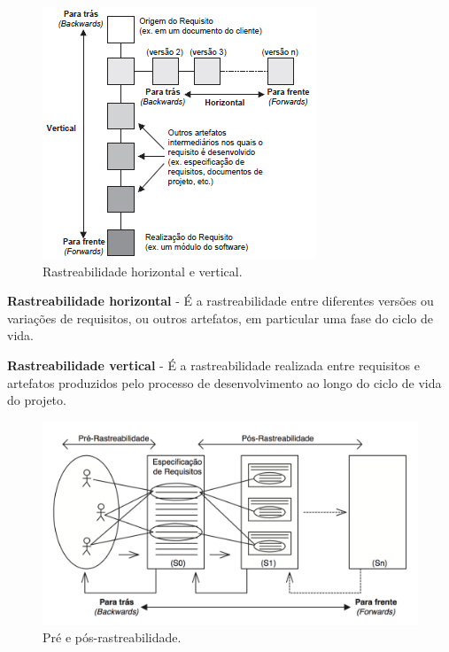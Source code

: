   \begin{figure}[!htbp]
    \centering
    \includegraphics[scale=0.75]{editaveis/figuras/tipos_de_rastreabilidade}
    \caption[Rastreabilidade horizontal e vertical.]{Rastreabilidade horizontal e vertical. \footnotemark}
    \label{ramos_rastreabilidade}
  \end{figure}

\textbf{Rastreabilidade horizontal} - É a rastreabilidade entre diferentes versões ou variações de requisitos, ou outros artefatos, em particular uma fase do ciclo de vida\cite{tese_doutorado}.

\textbf{Rastreabilidade vertical} - É a rastreabilidade realizada entre requisitos e artefatos produzidos pelo processo de desenvolvimento ao longo do ciclo de vida do projeto.\cite{tese_doutorado}

  \begin{figure}[!htbp]
    \centering
    \includegraphics[scale=0.4]{editaveis/figuras/pre_pos_rastreabilidade}
    \caption[Pré e pós-rastreabilidade.]{Pré e pós-rastreabilidade. \footnotemark}
    \label{pre_pos_rastreabilidade}
  \end{figure}

